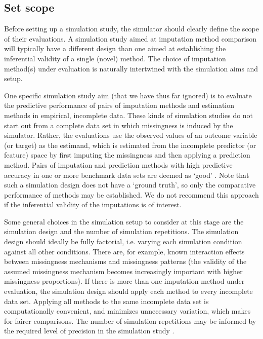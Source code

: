 \documentclass[bimj,fleqn]{w-art}
\begin{document}

\subsection{Set scope}

Before setting up a simulation study, the simulator should clearly define the scope of their evaluations. A simulation study aimed at imputation method comparison will typically have a different design than one aimed at establishing the inferential validity of a single (novel) method. The choice of imputation method(s) under evaluation is naturally intertwined with the simulation aims and setup.

One specific simulation study aim (that we have thus far ignored) is to evaluate the predictive performance of pairs of imputation methods and estimation methods in empirical, incomplete data. These kinds of simulation studies do not start out from a complete data set in which missingness is induced by the simulator. Rather, the evaluations use the observed values of an outcome variable (or target) as the estimand, which is estimated from the incomplete predictor (or feature) space by first imputing the missingness and then applying a prediction method. Pairs of imputation and prediction methods with high predictive accuracy in one or more benchmark data sets are deemed as `good' \citep{liu21}. Note that such a simulation design does not have a `ground truth', so only the comparative performance of methods may be established. We do not recommend this approach if the inferential validity of the imputations is of interest.

Some general choices in the simulation setup to consider at this stage are the simulation design and the number of simulation repetitions. The simulation design should ideally be fully factorial, i.e. varying each simulation condition against all other conditions. There are, for example, known interaction effects between missingness mechanisms and missingness patterns (the validity of the assumed missingness mechanism becomes increasingly important with higher missingness proportions). If there is more than one imputation method under evaluation, the simulation design should apply each method to every incomplete data set. Applying all methods to the same incomplete data set is computationally convenient, and minimizes unnecessary variation, which makes for fairer comparisons. The number of simulation repetitions may be informed by the required level of precision in the simulation study \citep[e.g. as determined from a maximum tolerable level of uncertainty in terms of a performance measure's Monte Carlo error][]{morr18}. 
\end{document}
